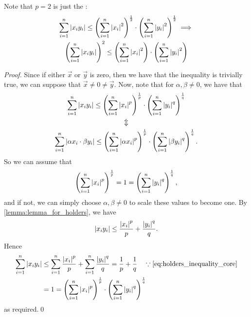 \documentclass[notoc,notitlepage]{tufte-book}
\begin{document}
\begin{note}
  Note that $p = 2$ is just the :
  \begin{gather*}
    \sum_{i=1}^{n} \left|x_i y_i\right| \leq \left( \sum_{i=1}^{n} \left|x_i\right|^2 \right)^{ \frac{1}{2} } \cdot \left( \sum_{i=1}^{n} \left|y_i\right|^2 \right)^{\frac{1}{2}} \implies \\
    \left( \sum_{i=1}^{n} \left|x_i y_i\right| \right)^2 \leq \left( \sum_{i=1}^{n} \left|x_i\right|^2 \right) \cdot \left( \sum_{i=1}^{n} \left|y_i\right|^2 \right)
  \end{gather*}
\end{note}

\begin{proof}
  Since if either $\vec{x}$ or $\vec{y}$ is zero, then we have that the inequality is trivially true, we can suppose that $\vec{x} \neq 0 \neq \vec{y}$. Now, note that for $\alpha, \beta \neq 0$, we have that
  \begin{gather*}
    \sum_{i=1}^{n}  \left| x_i y_i \right| \leq \left( \sum_{i=1}^{n} \left|x_i\right|^p \right)^{\frac{1}{p}} \cdot \left( \sum_{i=1}^{n} \left|y_i\right|^q \right)^{\frac{1}{q}} \\
    \Updownarrow \\
    \sum_{i=1}^{n}  \left| \alpha x_i \cdot \beta y_i \right| \leq \left( \sum_{i=1}^{n} \left|\alpha x_i\right|^p \right)^{\frac{1}{p}} \cdot \left( \sum_{i=1}^{n} \left|\beta y_i\right|^q \right)^{\frac{1}{q}}.
  \end{gather*}
  So we can assume that
  \begin{equation}\label{eq:holders_inequality_core}
    \left( \sum_{i=1}^{n} \left|x_i\right|^p \right)^\frac{1}{p} = 1 = \left( \sum_{i=1}^{n} \left|y_i\right|^q \right)^\frac{1}{q},
  \end{equation}
  and if not, we can simply choose $\alpha, \beta \neq 0$ to scale these values to become one. By \cref{lemma:lemma_for_holders}, we have
  \begin{equation*}
    \left|x_i y_i\right| \leq \frac{\left|x_i\right|^p}{p} + \frac{\left|y_i\right|^q}{q}.
  \end{equation*}
  Hence
  \begin{align*}
    \sum_{i=1}^{n} \abs{x_i y_i} &\leq \sum_{i=1}^{n} \frac{\abs{x_i}^p}{p} + \sum_{i=1}^{n} \frac{\abs{y_i}^q}{q} = \frac{1}{p} + \frac{1}{q} \quad \because \cref{eq:holders_inequality_core} \\
                                 &= 1 = \left( \sum_{i=1}^{n} \abs{x_i}^p \right)^\frac{1}{p} \cdot \left( \sum_{i=1}^{n} \abs{y_i}^q \right)^\frac{1}{q}
  \end{align*}
  as required.\qed
\end{proof}
\end{document}
